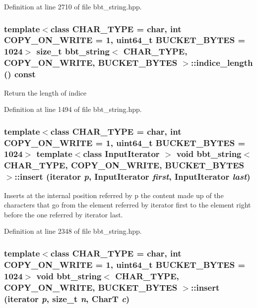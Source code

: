 Definition at line 2710 of file bbt\_\-string.hpp.\hypertarget{classbbt__string_f7d72888ed6e7c1b6f07d515b08b90dd}{
\subsubsection[{indice\_\-length}]{\setlength{\rightskip}{0pt plus 5cm}template$<$class CHAR\_\-TYPE  = char, int COPY\_\-ON\_\-WRITE = 1, uint64\_\-t BUCKET\_\-BYTES = 1024$>$ size\_\-t {\bf bbt\_\-string}$<$ CHAR\_\-TYPE, COPY\_\-ON\_\-WRITE, BUCKET\_\-BYTES $>$::indice\_\-length () const}}
\label{classbbt__string_f7d72888ed6e7c1b6f07d515b08b90dd}


Return the length of indice 

Definition at line 1494 of file bbt\_\-string.hpp.\hypertarget{classbbt__string_2720a0dd9a3b40ba8bda86d62a71c3c9}{
\subsubsection[{insert}]{\setlength{\rightskip}{0pt plus 5cm}template$<$class CHAR\_\-TYPE  = char, int COPY\_\-ON\_\-WRITE = 1, uint64\_\-t BUCKET\_\-BYTES = 1024$>$ template$<$class InputIterator $>$ void {\bf bbt\_\-string}$<$ CHAR\_\-TYPE, COPY\_\-ON\_\-WRITE, BUCKET\_\-BYTES $>$::insert (iterator {\em p}, \/  InputIterator {\em first}, \/  InputIterator {\em last})}}
\label{classbbt__string_2720a0dd9a3b40ba8bda86d62a71c3c9}


Inserts at the internal position referred by p the content made up of the characters that go from the element referred by iterator first to the element right before the one referred by iterator last. 

Definition at line 2348 of file bbt\_\-string.hpp.\hypertarget{classbbt__string_94e32cc061b77d94d5ccdd33375ac649}{
\subsubsection[{insert}]{\setlength{\rightskip}{0pt plus 5cm}template$<$class CHAR\_\-TYPE  = char, int COPY\_\-ON\_\-WRITE = 1, uint64\_\-t BUCKET\_\-BYTES = 1024$>$ void {\bf bbt\_\-string}$<$ CHAR\_\-TYPE, COPY\_\-ON\_\-WRITE, BUCKET\_\-BYTES $>$::insert (iterator {\em p}, \/  size\_\-t {\em n}, \/  CharT {\em c})}}
\label{classbbt__string_94e32cc061b77d94d5ccdd33375ac649}



